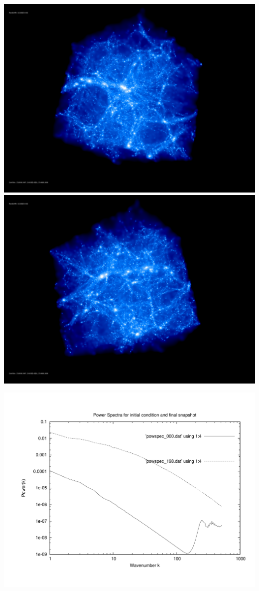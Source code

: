 \includegraphics[scale=0.1]{stages_07/rotate_00074.jpg} 
\includegraphics[scale=0.1]{stages_07/rotate_00131.jpg}

\includegraphics[scale=0.5]{stages_07/plot_powspec_stages_07}

